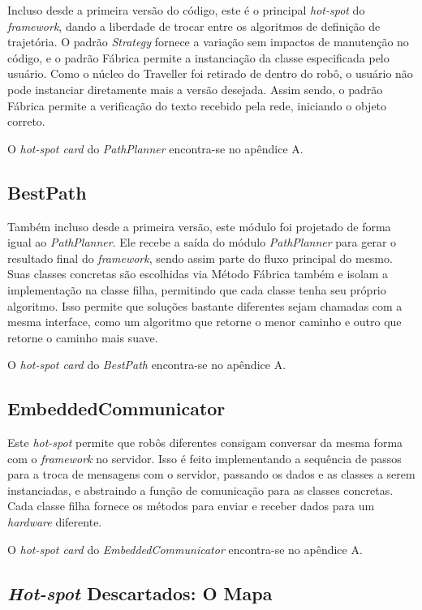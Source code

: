 Incluso desde a primeira versão do código, este é o principal \textit{hot-spot} do \textit{framework}, dando a liberdade de trocar entre os algoritmos de definição de trajetória. O padrão \textit{Strategy} fornece a variação sem impactos de manutenção no código, e o padrão Fábrica permite a instanciação da classe especificada pelo usuário. Como o núcleo do Traveller foi retirado de dentro do robô, o usuário não pode instanciar diretamente mais a versão desejada. Assim sendo, o padrão Fábrica permite a verificação do texto recebido pela rede, iniciando o objeto correto.

O \textit{hot-spot card} do \textit{PathPlanner} encontra-se no apêndice A.

\subsection{BestPath}

Também incluso desde a primeira versão, este módulo foi projetado de forma igual ao \textit{PathPlanner}. Ele recebe a saída do módulo \textit{PathPlanner} para gerar o resultado final do \textit{framework}, sendo assim parte do fluxo principal do mesmo. Suas classes concretas são escolhidas via Método Fábrica também e isolam a implementação na classe filha, permitindo que cada classe tenha seu próprio algoritmo. Isso permite que soluções bastante diferentes sejam chamadas com a mesma interface, como um algoritmo que retorne o menor caminho e outro que retorne o caminho mais suave.

O \textit{hot-spot card} do \textit{BestPath} encontra-se no apêndice A.

\subsection{EmbeddedCommunicator}

Este \textit{hot-spot} permite que robôs diferentes consigam conversar da mesma forma com o \textit{framework} no servidor. Isso é feito implementando a sequência de passos para a troca de mensagens com o servidor, passando os dados e as classes a serem instanciadas, e abstraindo a função de comunicação para as classes concretas. Cada classe filha fornece os métodos para enviar e receber dados para um \textit{hardware} diferente.

O \textit{hot-spot card} do \textit{EmbeddedCommunicator} encontra-se no apêndice A.

\subsection{\textit{Hot-spot} Descartados: O Mapa}

